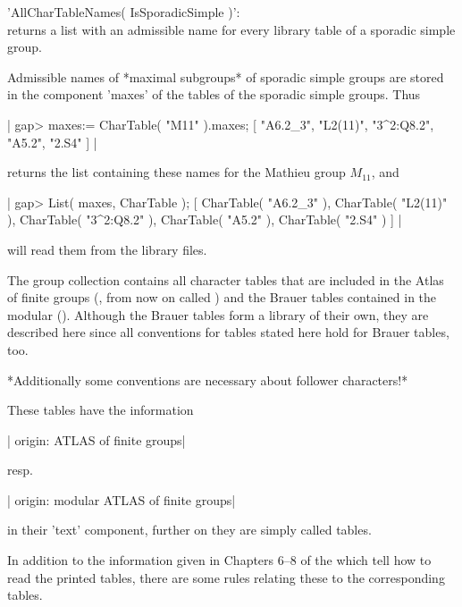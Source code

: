 'AllCharTableNames( IsSporadicSimple )': \\
         returns a list  with an admissible name  for every library table
         of a sporadic simple group.

\vspace{5mm}

Admissible  names  of *maximal subgroups*   of sporadic simple groups are
stored  in  the component 'maxes' of   the tables of  the sporadic simple
groups.  Thus

|    gap> maxes:= CharTable( "M11" ).maxes;
    [ "A6.2_3", "L2(11)", "3^2:Q8.2", "A5.2", "2.S4" ] |

returns the  list containing these  names for the Mathieu group $M_{11}$,
and

|    gap> List( maxes, CharTable );
    [ CharTable( "A6.2_3" ), CharTable( "L2(11)" ),
      CharTable( "3^2:Q8.2" ), CharTable( "A5.2" ), CharTable( "2.S4" ) ] |

will read them from the library files.

%

\def\ttquote{\char13}
\setlength{\unitlength}{0.1cm}

The   {\GAP} group collection contains   all  character  tables that  are
included in the Atlas of finite groups  (\cite{CCN85}, from now on called
{\ATLAS})  and the  Brauer  tables  contained  in  the modular   {\ATLAS}
(\cite{JLPW95}).  Although the Brauer tables form a library of their own,
they are described here since all  conventions for {\ATLAS} tables stated
here hold for Brauer tables, too.

*Additionally some conventions are necessary  about follower characters!*

These tables have the information

|    origin: ATLAS of finite groups|

resp.

|    origin: modular ATLAS of finite groups|

in their   'text' component, further on  they  are simply called {\ATLAS}
tables.

In addition to the  information  given in Chapters  6--8 of  the {\ATLAS}
which tell how to read the printed tables,  there are some rules relating
these to the corresponding {\GAP} tables.

